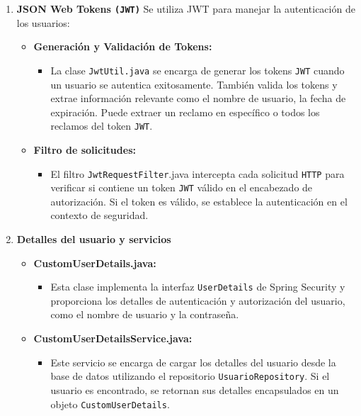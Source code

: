 \documentclass{article} %
\begin{document}
\begin{enumerate}
        \item \textbf{JSON Web Tokens \texttt{(JWT)}}
        \noindent Se utiliza JWT para manejar la autenticación de los usuarios:
        \begin{itemize}
            \item \textbf{Generación y Validación de Tokens:}
            \begin{itemize}
                \item La clase \texttt{JwtUtil.java} se encarga de generar los tokens \texttt{JWT} cuando un usuario se autentica exitosamente. También valida los tokens y extrae información relevante como el nombre de usuario, la fecha de expiración. Puede extraer un reclamo en específico o todos los reclamos del token \texttt{JWT}.
            \end{itemize}
            \item \textbf{Filtro de solicitudes:}
            \begin{itemize}
                \item El filtro \texttt{JwtRequestFilter}.java intercepta cada solicitud \texttt{HTTP} para verificar si contiene un token \texttt{JWT} válido en el encabezado de autorización. Si el token es válido, se establece la autenticación en el contexto de seguridad.
            \end{itemize}
        \end{itemize}
        
        \item \textbf{Detalles del usuario y servicios}
        \begin{itemize}
            \item \textbf{CustomUserDetails.java:}
            \begin{itemize}
                \item Esta clase implementa la interfaz \texttt{UserDetails} de Spring Security y proporciona los detalles de autenticación y autorización del usuario, como el nombre de usuario y la contraseña.
            \end{itemize}
            \item \textbf{CustomUserDetailsService.java:}
            \begin{itemize}
                \item Este servicio se encarga de cargar los detalles del usuario desde la base de datos utilizando el repositorio \texttt{UsuarioRepository}. Si el usuario es encontrado, se retornan sus detalles encapsulados en un objeto \texttt{CustomUserDetails}.
            \end{itemize}
        \end{itemize}
    \end{enumerate}
\end{document}
